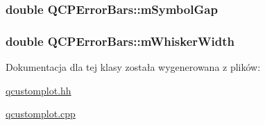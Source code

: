 \subsubsection[{\texorpdfstring{m\+Symbol\+Gap}{mSymbolGap}}]{\setlength{\rightskip}{0pt plus 5cm}double Q\+C\+P\+Error\+Bars\+::m\+Symbol\+Gap\hspace{0.3cm}{\ttfamily [protected]}}\hypertarget{class_q_c_p_error_bars_a5cb5628b75e5aff0875710705666ec57}{}\label{class_q_c_p_error_bars_a5cb5628b75e5aff0875710705666ec57}
\subsubsection[{\texorpdfstring{m\+Whisker\+Width}{mWhiskerWidth}}]{\setlength{\rightskip}{0pt plus 5cm}double Q\+C\+P\+Error\+Bars\+::m\+Whisker\+Width\hspace{0.3cm}{\ttfamily [protected]}}\hypertarget{class_q_c_p_error_bars_a3873724f7ac3392bdf9d46a47076a1d2}{}\label{class_q_c_p_error_bars_a3873724f7ac3392bdf9d46a47076a1d2}


Dokumentacja dla tej klasy została wygenerowana z plików\+:\begin{DoxyCompactItemize}
\item 
\hyperlink{qcustomplot_8hh}{qcustomplot.\+hh}\item 
\hyperlink{qcustomplot_8cpp}{qcustomplot.\+cpp}\end{DoxyCompactItemize}
